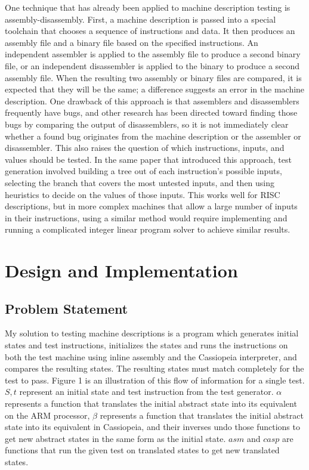 \documentclass[letterpaper,12pt]{article}
\begin{document}
One technique that has already been applied to machine description testing is assembly-disassembly. First, a machine description is passed into a special toolchain that chooses a sequence of instructions and data. It then produces an assembly file and a binary file based on the specified instructions. An independent assembler is applied to the assembly file to produce a second binary file, or an independent disassembler is applied to the binary to produce a second assembly file. When the resulting two assembly or binary files are compared, it is expected that they will be the same; a difference suggests an error in the machine description. One drawback of this approach is that assemblers and disassemblers frequently have bugs, and other research has been directed toward finding those bugs by comparing the output of disassemblers\cite{Nvd}, so it is not immediately clear whether a found bug originates from the machine description or the assembler or disassembler. This also raises the question of which instructions, inputs, and values should be tested. In the same paper that introduced this approach, test generation involved building a tree out of each instruction's possible inputs, selecting the branch that covers the most untested inputs, and then using heuristics to decide on the values of those inputs\cite{Checker}. This works well for RISC descriptions, but in more complex machines that allow a large number of inputs in their instructions, using a similar method would require implementing and running a complicated integer linear program solver to achieve similar results.

\section{Design and Implementation}

\subsection{Problem Statement}

My solution to testing machine descriptions is a program which generates initial states and test instructions, initializes the states and runs the instructions on both the test machine using inline assembly and the Cassiopeia interpreter, and compares the resulting states. The resulting states must match completely for the test to pass. Figure 1 is an illustration of this flow of information for a single test. $S, t$ represent an initial state and test instruction from the test generator. $\alpha$ represents a function that translates the initial abstract state into its equivalent on the ARM processor, $\beta$ represents a function that translates the initial abstract state into its equivalent in Cassiopeia, and their inverses undo those functions to get new abstract states in the same form as the initial state. $asm$ and $casp$ are functions that run the given test on translated states to get new translated states.
\end{document}
